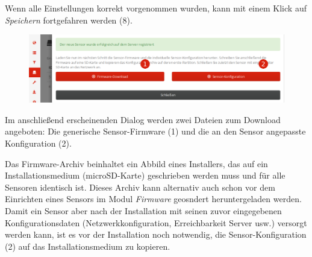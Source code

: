 \documentclass[12pt]{article}
\begin{document}
Wenn alle Einstellungen korrekt vorgenommen wurden, kann mit einem Klick auf \textit{Speichern} fortgefahren werden (8).

\begin{figure}[h]
				\centering
				\includegraphics[width=\textwidth]{./graphics/howto-sensor-add-3.png}
				\label{fig:howto-sensor-add-3}
\end{figure}

Im anschließend erscheinenden Dialog werden zwei Dateien zum Download angeboten: Die generische Sensor-Firmware (1) und die an den Sensor angepasste Konfiguration (2). 

Das Firmware-Archiv beinhaltet ein Abbild eines Installers, das auf ein Installationsmedium (microSD-Karte) geschrieben werden muss und für alle Sensoren identisch ist. Dieses Archiv kann alternativ auch schon vor dem Einrichten eines Sensors im Modul \textit{Firmware} geosndert heruntergeladen werden. Damit ein Sensor aber nach der Installation mit seinen zuvor eingegebenen Konfigurationsdaten (Netzwerkkonfiguration, Erreichbarkeit Server usw.) versorgt werden kann, ist es vor der Installation noch notwendig, die Sensor-Konfiguration (2) auf das Installationsmedium zu kopieren.
\end{document}
